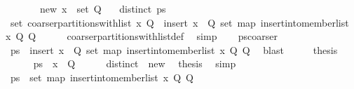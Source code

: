 \begin{isabellebody}
\ \ \ \ \ \ \ new{\isacharcolon}\ {\isachardoublequoteopen}{\isacharbraceleft}x{\isacharbraceright}\ {\isasymnotin}\ set\ Q{\isachardoublequoteclose}\isanewline
\ \ \ {\isachardoublequoteopen}distinct\ ps{\isachardoublequoteclose}\isanewline
%
\isadelimproof
%
\endisadelimproof
%
\isatagproof
{}\isamarkupfalse%
\ {\isacharminus}\isanewline
\ \ \isamarkupfalse%
\ {\isachardoublequoteopen}set\ {\isacharparenleft}coarser{\isacharunderscore}partitions{\isacharunderscore}with{\isacharunderscore}list\ x\ Q{\isacharparenright}\ {\isacharequal}\ insert\ {\isacharparenleft}{\isacharbraceleft}x{\isacharbraceright}\ {\isacharhash}\ Q{\isacharparenright}\ {\isacharparenleft}set\ {\isacharparenleft}map\ {\isacharparenleft}insert{\isacharunderscore}into{\isacharunderscore}member{\isacharunderscore}list\ x\ Q{\isacharparenright}\ Q{\isacharparenright}{\isacharparenright}{\isachardoublequoteclose}\isanewline
\ \ \ \ \isamarkupfalse%
\ coarser{\isacharunderscore}partitions{\isacharunderscore}with{\isacharunderscore}list{\isacharunderscore}def\ \isamarkupfalse%
\ simp\isanewline
\ \ \isamarkupfalse%
\ ps{\isacharunderscore}coarser\ \isamarkupfalse%
\ {\isachardoublequoteopen}ps\ {\isasymin}\ insert\ {\isacharparenleft}{\isacharbraceleft}x{\isacharbraceright}\ {\isacharhash}\ Q{\isacharparenright}\ {\isacharparenleft}set\ {\isacharparenleft}map\ {\isacharparenleft}{\isacharparenleft}insert{\isacharunderscore}into{\isacharunderscore}member{\isacharunderscore}list\ x\ Q{\isacharparenright}{\isacharparenright}\ Q{\isacharparenright}{\isacharparenright}{\isachardoublequoteclose}\ \isamarkupfalse%
\ blast\isanewline
\ \ \isamarkupfalse%
\ \isamarkupfalse%
\ {\isacharquery}thesis\isanewline
\ \ \isamarkupfalse%
\isanewline
\ \ \ \ \isamarkupfalse%
\ {\isachardoublequoteopen}ps\ {\isacharequal}\ {\isacharbraceleft}x{\isacharbraceright}\ {\isacharhash}\ Q{\isachardoublequoteclose}\isanewline
\ \ \ \ \isamarkupfalse%
\ distinct\ \ new\ \isamarkupfalse%
\ {\isacharquery}thesis\ \isamarkupfalse%
\ simp\isanewline
\ \ \isamarkupfalse%
\isanewline
\ \ \ \ \isamarkupfalse%
\ {\isachardoublequoteopen}ps\ {\isasymin}\ set\ {\isacharparenleft}map\ {\isacharparenleft}insert{\isacharunderscore}into{\isacharunderscore}member{\isacharunderscore}list\ x\ Q{\isacharparenright}\ Q{\isacharparenright}{\isachardoublequoteclose}\isanewline

\end{isabellebody}
